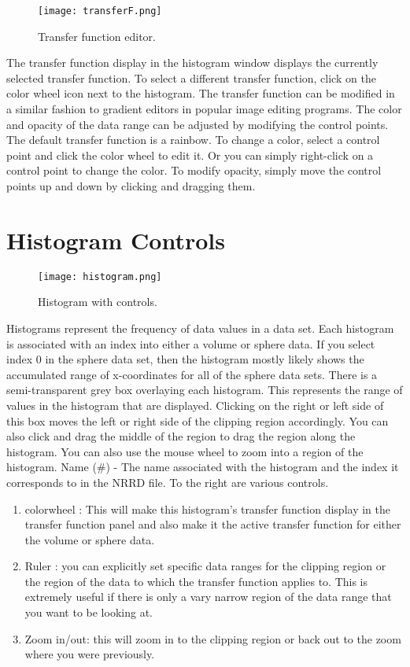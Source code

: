 \begin{figure}[htbp]
  \center
  \texttt{[image: transferF.png]}
  \caption{Transfer function editor.}
  \label{fig:manta_tf}
\end{figure}

The transfer function display in the histogram window displays the currently selected transfer function. To select a different transfer function, click on the color wheel icon next to the histogram. The transfer function can be modified in a similar fashion to gradient editors in popular image editing programs. The color and opacity of the data range can be adjusted by modifying the control points. The default transfer function is a rainbow. To change a color, select a control point and click the color wheel to edit it. Or you can simply right-click on a control point to change the color. To modify opacity, simply move the control points up and down by clicking and dragging them.

\section{Histogram Controls}

\begin{figure}[htbp]
  \center
  \texttt{[image: histogram.png]}
  \caption{Histogram with controls.}
  \label{fig:manta_histogram}
\end{figure}

Histograms represent the frequency of data values in a data set. Each histogram is associated with an index into either a volume or sphere data. If you select index 0 in the sphere data set, then the histogram mostly likely shows the accumulated range of x-coordinates for all of the sphere data sets. There is a semi-transparent grey box overlaying each histogram. This represents the range of values in the histogram that are displayed. Clicking on the right or left side of this box moves the left or right side of the clipping region accordingly. You can also click and drag the middle of the region to drag the region along the histogram. You can also use the mouse wheel to zoom into a region of the histogram.
  Name (\#) - The name associated with the histogram and the index it corresponds to in the NRRD file. 
To the right are various controls.

\begin{enumerate}
\item
colorwheel : This will make this histogram's transfer function display in the transfer function panel and also make it the active transfer function for either the volume or sphere data.
\item
Ruler : you can explicitly set specific data ranges for the clipping region or the region of the data to which the transfer function applies to. This is extremely useful if there is only a vary narrow region of the data range that you want to be looking at.
\item
Zoom in/out: this will zoom in to the clipping region or back out to the zoom where you were previously. 
\end{enumerate}

